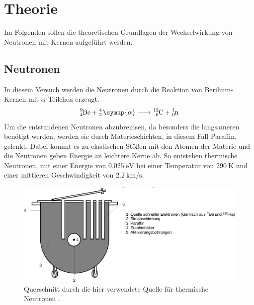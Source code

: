 \section{Theorie} \label{sec:theorie}

    Im Folgenden sollen die theoretischen Grundlagen der Wechselwirkung von Neutronen mit Kernen aufgeführt werden.

\subsection{Neutronen}

    In diesem Versuch werden die Neutronen durch die Reaktion von Berilium-Kernen mit $\alpha$-Teilchen erzeugt.
    \begin{equation*}
        \ce{^{9}_{4}Be + ^{4}_{2} \symup{\alpha} -> ^{12}_{6}C + ^{1}_{0}n}
    \end{equation*}
    Um die entstandenen Neutronen abzubremsen, da besonders die langsameren benötigt werden,
    werden sie durch Materieschichten, in diesem Fall Paraffin, gelenkt.
    Dabei kommt es zu elastischen Stößen mit den Atomen der Materie und die Neutronen geben Energie an leichtere Kerne ab.
    So entstehen thermische Neutronen,
    mit einer Energie von $\SI{0,025}{\electronvolt}$ bei einer Temperatur von $\SI{290}{\kelvin}$
    und einer mittleren Geschwindigkeit von $\SI{2,2}{\kilo\meter\per\second}$.

    \begin{figure}[H]
      \centering
      \includegraphics[width=\textwidth]{content/img/V702_Abb1.jpg}
      \caption{Querschnitt durch die hier verwendete Quelle für thermische Neutronen \cite{versuchsanleitung}.}
      \label{fig:neutronenquelle}
    \end{figure}

